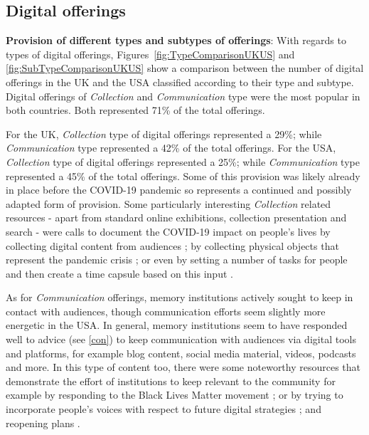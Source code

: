 \documentclass{egpubl}
\begin{document}

\subsection{Digital offerings}
\label{dig}
\noindent \textbf{Provision of different types and subtypes of offerings}:  With regards to types of digital offerings, Figures~\ref{fig:TypeComparisonUKUS} and \ref{fig:SubTypeComparisonUKUS} show a comparison between the number of digital offerings in the UK and the USA classified according to their type and subtype. Digital offerings of \emph{Collection} and \emph{Communication} type were the most popular in both countries. Both represented 71\% of the total offerings. 

For the UK, \emph{Collection} type of digital offerings represented a 29\%; while \emph{Communication} type represented a 42\% of the total offerings. For the USA, \emph{Collection} type of digital offerings represented a 25\%; while \emph{Communication} type represented a 45\% of the total offerings. Some of this provision was likely already in place before the COVID-19 pandemic so represents a continued and possibly adapted form of provision. Some particularly interesting \textit{Collection} related resources - apart from standard online exhibitions, collection presentation and search - were calls to document the COVID-19 impact on people's lives by collecting digital content from audiences \cite{NationalPortraitGallery2020,EllaSharpMuseum2020}; by collecting physical objects that represent the pandemic crisis \cite{MuseumsSheffield2020}; or even by setting a number of tasks for people and then create a time capsule based on this input \cite{York2020}.

As for \textit{Communication} offerings, memory institutions actively sought to keep in contact with audiences, though communication efforts seem slightly more energetic in the USA. In general, memory institutions seem to have responded well to advice (see \ref{con}) to keep communication with audiences via digital tools and platforms, for example blog content, social media material, videos, podcasts and more. In this type of content too, there were some noteworthy resources that demonstrate the effort of institutions to keep relevant to the community for example by responding to the Black Lives Matter movement \cite{Greer2020,Wali2020,Feldman2020}; or by trying to incorporate people's voices with respect to future digital strategies \cite{HistoricAlexandria2020}; and reopening plans \cite{BlackCountryLivingMuseum2020,BristolMuseums2020}. 
\end{document}
